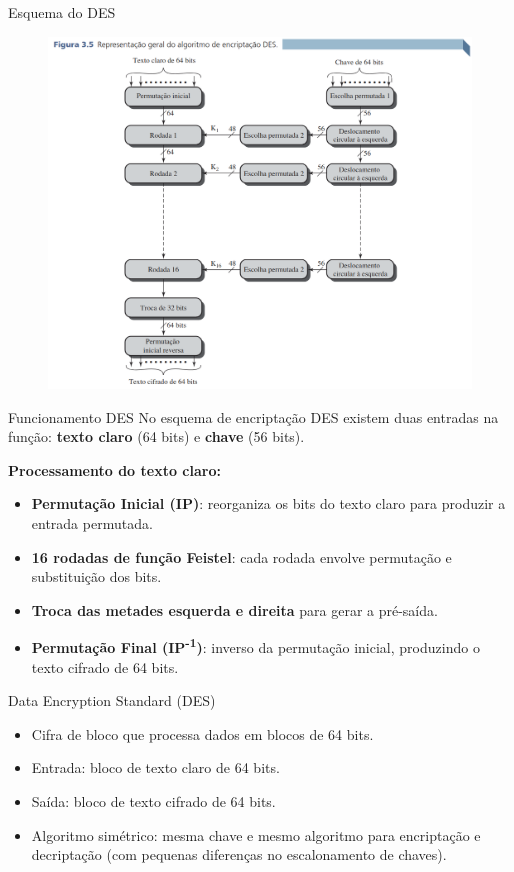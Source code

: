 \begin{frame}{Esquema do DES}


    \begin{figure}
        \centering
        \includegraphics[width=0.6\linewidth]{Figuras/DES-esquema.png}

    \end{figure}

\end{frame}

\begin{frame}{Funcionamento DES}
    No esquema de encriptação DES existem duas entradas na função:
    \textbf{texto claro} (64 bits) e \textbf{chave} (56 bits).

    \vspace{0.3cm}
    \textbf{Processamento do texto claro:}
    \begin{itemize}
        \item \textbf{Permutação Inicial (IP)}: reorganiza os bits do texto claro para produzir a entrada permutada.
        \item \textbf{16 rodadas de função Feistel}: cada rodada envolve permutação e substituição dos bits.
        \item \textbf{Troca das metades esquerda e direita} para gerar a pré-saída.
        \item \textbf{Permutação Final (IP\textsuperscript{-1})}: inverso da permutação inicial, produzindo o texto cifrado de 64 bits.
    \end{itemize}



\end{frame}

\begin{frame}{Data Encryption Standard (DES)}
    \begin{itemize}
        \item Cifra de bloco que processa dados em blocos de 64 bits.
        \item Entrada: bloco de texto claro de 64 bits.
        \item Saída: bloco de texto cifrado de 64 bits.
        \item Algoritmo simétrico: mesma chave e mesmo algoritmo para encriptação e decriptação (com pequenas diferenças no escalonamento de chaves).
    \end{itemize}



\end{frame}


